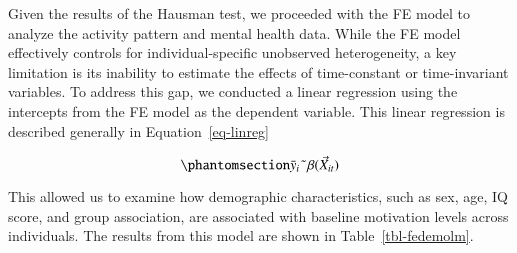 \documentclass[
  letterpaper,
  number,
  review,
  3p]{elsarticle}
\begin{document}
Given the results of the Hausman test, we proceeded with the FE model to
analyze the activity pattern and mental health data. While the FE model
effectively controls for individual-specific unobserved heterogeneity, a
key limitation is its inability to estimate the effects of time-constant
or time-invariant variables. To address this gap, we conducted a linear
regression using the intercepts from the FE model as the dependent
variable. This linear regression is described generally in
Equation~\ref{eq-linreg}

\begin{equation}\phantomsection\label{eq-linreg}{
\bar{y}_{i} \; \tilde{} \; \beta (\vec{X}_{it})
}\end{equation}

This allowed us to examine how demographic characteristics, such as sex,
age, IQ score, and group association, are associated with baseline
motivation levels across individuals. The results from this model are
shown in Table~\ref{tbl-fedemolm}.

\begin{table}

\caption{\label{tbl-fedemolm}Fixed Effects and Demographics Regression
(Y-value: motivation level)}


\end{table}%
\end{document}
